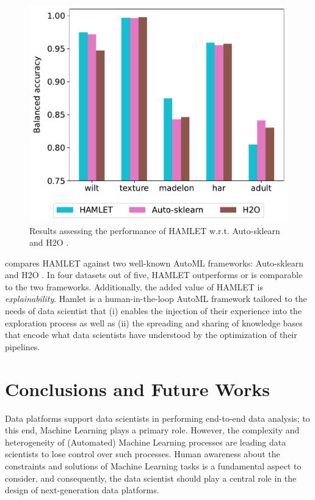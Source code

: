 \begin{figure}[t]
    \centering
    \includegraphics[scale=.45]{chapters/human-centric/hamlet/img/comparison.pdf}
    \caption{Results assessing the performance of HAMLET w.r.t. Auto-sklearn \cite{feurer2019auto} and H2O \cite{ledell2020h2o}.}
    \label{hamlet-fig:comparison}
\end{figure}


 compares HAMLET against two well-known AutoML frameworks: Auto-sklearn \cite{feurer2019auto} and H2O \cite{ledell2020h2o}.
In four datasets out of five, HAMLET outperforms or is comparable to the two frameworks.
Additionally, the added value of HAMLET is \textit{explainability}.
Hamlet is a human-in-the-loop AutoML framework tailored to the needs of data scientist that (i) enables the injection of their experience into the exploration process as well as (ii) the spreading and sharing of knowledge bases that encode what data scientists have understood by the optimization of their pipelines.


\section{Conclusions and Future Works}\label{hamlet-sec:conclusion}

Data platforms support data scientists in performing end-to-end data analysis; to this end, Machine Learning plays a primary role.
However, the complexity and heterogeneity of (Automated) Machine Learning processes are leading data scientists to lose control over such processes.
Human awareness about the constraints and solutions of Machine Learning tasks is a fundamental aspect to consider, and consequently, the data scientist should play a central role in the design of next-generation data platforms.


